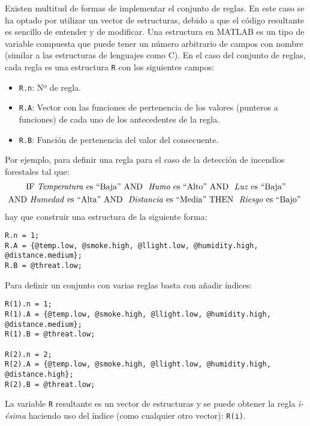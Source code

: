 Existen multitud de formas de implementar el conjunto de reglas. En este caso se ha optado por utilizar un vector de estructuras, debido a que el código resultante es sencillo de entender y de modificar. Una estructura en MATLAB es un tipo de variable compuesta que puede tener un número arbitrario de campos con nombre (similar a las estructuras de lenguajes como C). En el caso del conjunto de reglas, cada regla es una estructura \lstinline|R| con los siguientes campos:

\begin{itemize}
\item \lstinline|R.n|: Nº de regla.
\item \lstinline|R.A|: Vector con las funciones de pertenencia de los valores (punteros a funciones) de cada uno de los antecedentes de la regla.
\item \lstinline|R.B|: Función de pertenencia del valor del consecuente.
\end{itemize}
 
Por ejemplo, para definir una regla para el caso de la detección de incendios forestales tal que:
\begin{multline}
\text{IF \emph{Temperatura} es ``Baja'' AND }  \text{ \emph{Humo} es ``Alto'' AND } \text{ \emph{Luz} es ``Baja''} \\
\text{AND \emph{Humedad} es ``Alta'' AND }  \text{ \emph{Distancia} es ``Media'' THEN }  \text{ \emph{Riesgo} es ``Bajo'' }
\end{multline}
hay que construir una estructura de la siguiente forma:
 
\begin{lstlisting}
R.n = 1;
R.A = {@temp.low, @smoke.high, @llight.low, @humidity.high, @distance.medium};
R.B = @threat.low;
\end{lstlisting}
 
Para definir un conjunto con varias reglas basta con añadir índices:
 
\begin{lstlisting}
R(1).n = 1;
R(1).A = {@temp.low, @smoke.high, @llight.low, @humidity.high, @distance.medium};
R(1).B = @threat.low;

R(2).n = 2;
R(2).A = {@temp.low, @smoke.high, @llight.low, @humidity.high, @distance.high};
R(2).B = @threat.low;
\end{lstlisting}

La variable \lstinline|R| resultante es un vector de estructuras y se puede obtener la regla \emph{i-ésima} haciendo uso del índice (como cualquier otro vector): \lstinline|R(i)|.

